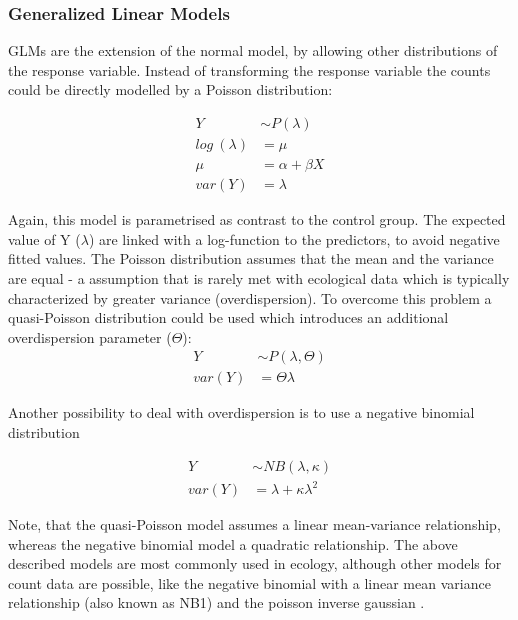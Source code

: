 \documentclass{scrartcl}
\begin{document}
\subsubsection{Generalized Linear Models}
GLMs are the extension of the normal model, by allowing other distributions of the response variable.
Instead of transforming the response variable the counts could be directly modelled by a Poisson distribution:

$$\begin{aligned}
  Y &\sim P(\lambda) \nonumber \\
  log~(\lambda) &= \mu \label{eqn:pois} \\
  \mu &= \alpha + \beta X \nonumber \\
  var(Y) &= \lambda \nonumber
\end{aligned}$$

Again, this model is parametrised as contrast to the control group. 
The expected value of Y ($\lambda$) are linked with a log-function to the predictors, to avoid negative fitted values. 
The Poisson distribution assumes that the mean and the variance are equal - a assumption that is rarely met with ecological data which is typically characterized by greater variance (overdispersion).
To overcome this problem a quasi-Poisson distribution could be used which introduces an additional overdispersion parameter ($\Theta$):
$$\begin{aligned}
  Y &\sim P(\lambda, \Theta) \label{eqn:quasi} \\
  var(Y) &= \Theta \lambda  \nonumber
\end{aligned}$$

Another possibility to deal with overdispersion is to use a negative binomial distribution

$$\begin{aligned}
  Y &\sim NB(\lambda, \kappa) \label{eqn:negbin}  \\
  var(Y) &= \lambda + \kappa \lambda^2 \nonumber
\end{aligned}$$

Note, that the quasi-Poisson model assumes a linear mean-variance relationship, whereas the negative binomial model a quadratic relationship.
The above described models are most commonly used in ecology, although other models for count data are possible, like the negative binomial with a linear mean variance relationship (also known as NB1) and the poisson inverse gaussian \citep{hilbe_modeling_2014}.
\end{document}
